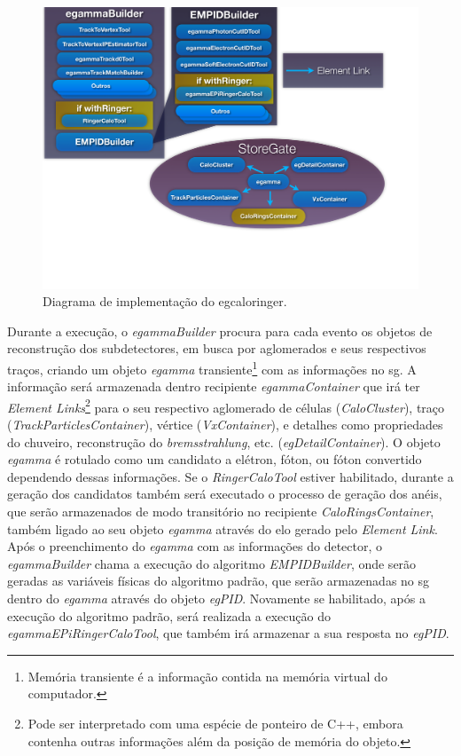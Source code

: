 \begin{figure}[ht!]
\label{fig:implementacao_ringer}
\centering
\includegraphics[width=1.0\textwidth]{imagens/implementacao_ringer.pdf}
\caption[Diagrama de implementação do \protect\gls{egcaloringer}]{Diagrama de
implementação do \gls{egcaloringer}.}
\end{figure}

Durante a execução, o \emph{egammaBuilder}
procura para cada evento os objetos de reconstrução dos subdetectores,
em busca por aglomerados e seus respectivos traços, criando um objeto 
\emph{egamma} transiente\footnote{Memória transiente é a informação contida na memória 
virtual do computador.} com as informações no \gls{sg}. A informação será
armazenada dentro recipiente \emph{egammaContainer} que irá ter \emph{Element
Links}\footnote{Pode ser interpretado com uma espécie de ponteiro de C++, embora
contenha outras informações além da posição de memória do objeto.} para o seu
respectivo aglomerado de células (\emph{CaloCluster}), traço
(\emph{TrackParticlesContainer}), vértice (\emph{VxContainer}), e detalhes como
propriedades do chuveiro, reconstrução do \emph{bremsstrahlung}, etc. (\emph{egDetailContainer}). 
O objeto \emph{egamma} é rotulado como um candidato a elétron, fóton, ou 
fóton convertido dependendo dessas informações. Se o \emph{RingerCaloTool}
estiver habilitado, durante a geração dos candidatos também será executado o
processo de geração dos anéis, que serão armazenados de modo transitório no
recipiente \emph{CaloRingsContainer}, também ligado ao seu objeto \emph{egamma}
através do elo gerado pelo \emph{Element Link}. Após o preenchimento do
\emph{egamma} com as informações do detector, o \emph{egammaBuilder} chama a
execução do algoritmo \emph{EMPIDBuilder}, onde serão geradas as variáveis 
físicas do algoritmo padrão, que serão armazenadas no \gls{sg} dentro do
\emph{egamma} através do objeto \emph{egPID}. Novamente se habilitado, após a
execução do algoritmo padrão, será realizada a execução do
\emph{egammaEPiRingerCaloTool}, que também irá armazenar a sua resposta no
\emph{egPID}.

